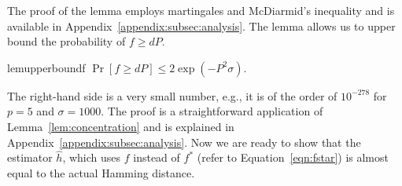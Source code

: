
The proof of the lemma employs martingales and McDiarmid's inequality and is available in Appendix~\ref{appendix:subsec:analysis}. 
%
The lemma allows us to upper bound the probability of $f \ge dP$.

\begin{restatable}{lem}{upperboundf}\label{lem:upper-bound-f}
    $\Pr[f \ge dP] \le 2 \exp(-P^2\sigma)$.
\end{restatable}

The right-hand side is a very small number, e.g., it is of the order of $10^{-278}$ for $p=5$ and $\sigma=1000$. 
The proof is a straightforward application of Lemma~\ref{lem:concentration} and is explained in Appendix~\ref{appendix:subsec:analysis}. Now we are ready to show that the estimator $\hat{h}$, which uses $f$ instead of
$f^*$ (refer to Equation~\ref{eqn:fstar}) is almost equal to the actual Hamming distance.

